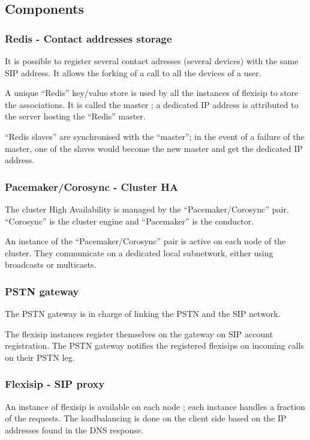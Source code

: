\documentclass[a4paper,10pt]{article}
\begin{document}
\subsection{Components}

\subsubsection{Redis - Contact addresses storage}
It is possible to register several contact adresses (several devices) with the same SIP address.
It allows the forking of a call to all the devices of a user.

A unique ``Redis'' key/value store is used by all the instances of flexisip to store the associations.
It is called the master ; a dedicated IP address is attributed to the server hosting the ``Redis'' master.

``Redis slaves'' are synchronised with the ``master''; in the event of a failure of the master,
one of the slaves would become the new master and get the dedicated IP address.



\subsubsection{Pacemaker/Corosync - Cluster HA}
The cluster High Availability is managed by the ``Pacemaker/Corosync'' pair.
``Corosync'' is the cluster engine and ``Pacemaker'' is the conductor.

An instance of the ``Pacemaker/Corosync'' pair is active on each node of the cluster.
They communicate on a dedicated local subnetwork, either using broadcasts or multicasts.


\subsubsection{PSTN gateway}
The PSTN gateway is in charge of linking the PSTN and the SIP network.

The flexisip instances register themselves on the gateway on SIP account registration.
The PSTN gateway notifies the registered flexisips on incoming calls on their PSTN leg.


\subsubsection{Flexisip - SIP proxy}
An instance of flexisip is available on each node ; each instance handles a fraction of the requests.
The loadbalancing is done on the client side based on the IP addresses found in the DNS response.
\end{document}

